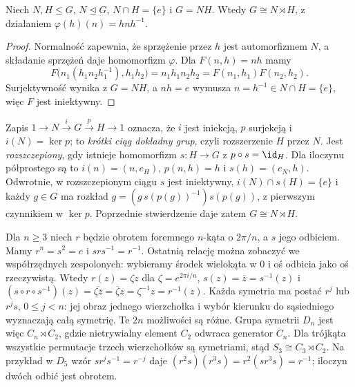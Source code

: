 \begin{stwierdzenie}
Niech $N,H\leq G$, $N\trianglelefteq G$, $N\cap H=\{e\}$ i $G=NH$.
Wtedy $G\cong N\rtimes H$, z działaniem $\varphi(h)(n)=hnh^{-1}$.
\end{stwierdzenie}
\begin{proof}
Normalność zapewnia, że sprzężenie przez $h$ jest automorfizmem $N$,
a składanie sprzężeń daje homomorfizm $\varphi$.
Dla $F(n,h)=nh$ mamy
\[
 F\bigl(n_1(h_1n_2h_1^{-1}),h_1h_2\bigr)
 =n_1h_1n_2h_2=F(n_1,h_1)F(n_2,h_2).
\]
Surjektywność wynika z $G=NH$, a $nh=e$ wymusza
$n=h^{-1}\in N\cap H=\{e\}$, więc $F$ jest iniektywny.
\end{proof}

\begin{uwaga}
Zapis $1\to N\xrightarrow{i}G\xrightarrow{p}H\to1$ oznacza,
że $i$ jest iniekcją, $p$ surjekcją i $i(N)=\ker p$; to
\emph{krótki ciąg dokładny grup}, czyli rozszerzenie $H$ przez $N$.
Jest \emph{rozszczepiony}, gdy istnieje homomorfizm $s:H\to G$
z $p\circ s=\id_H$. Dla iloczynu półprostego są to
$i(n)=(n,e_H)$, $p(n,h)=h$ i $s(h)=(e_N,h)$.
Odwrotnie, w rozszczepionym ciągu $s$ jest iniektywny,
$i(N)\cap s(H)=\{e\}$ i każdy $g\in G$ ma rozkład
$g=(g\,s(p(g))^{-1})s(p(g))$, z pierwszym czynnikiem w $\ker p$.
Poprzednie stwierdzenie daje zatem $G\cong N\rtimes H$.
\end{uwaga}

\begin{przyklad}
Dla $n\geq3$ niech $r$ będzie obrotem foremnego $n$-kąta o $2\pi/n$,
a $s$ jego odbiciem. Mamy $r^n=s^2=e$ i $srs^{-1}=r^{-1}$.
Ostatnią relację można zobaczyć we współrzędnych zespolonych:
wybieramy środek wielokąta w $0$ i oś odbicia jako oś rzeczywistą.
Wtedy $r(z)=\zeta z$ dla $\zeta=e^{2\pi i/n}$,
$s(z)=\overline z=s^{-1}(z)$ i
$(s\circ r\circ s^{-1})(z)=\overline{\zeta\overline z}
=\overline\zeta z=\zeta^{-1}z=r^{-1}(z)$.
Każda symetria ma postać $r^j$ lub $r^js$, $0\leq j<n$:
jej obraz jednego wierzchołka i wybór kierunku do sąsiedniego
wyznaczają całą symetrię. Te $2n$ możliwości są różne.
Grupa symetrii $D_n$ jest więc $C_n\rtimes C_2$, gdzie nietrywialny
element $C_2$ odwraca generator $C_n$. Dla trójkąta wszystkie
permutacje trzech wierzchołków są symetriami, stąd
$S_3\cong C_3\rtimes C_2$.
Na przykład w $D_5$ wzór $sr^js^{-1}=r^{-j}$ daje
$(r^2s)(r^3s)=r^2(sr^3s)=r^{-1}$; iloczyn dwóch odbić jest obrotem.
\end{przyklad}

